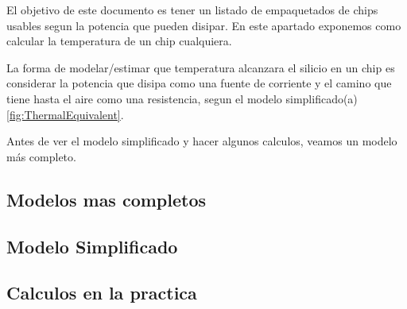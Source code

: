 El objetivo de este documento es tener un listado de empaquetados de chips usables segun
la potencia que pueden disipar. En este apartado exponemos como calcular la temperatura de un
chip cualquiera.

La forma de modelar/estimar que temperatura alcanzara el silicio en un chip es considerar
la potencia que disipa como una fuente de corriente y el camino que tiene hasta el aire como
una resistencia, segun el modelo simplificado(a)\ref{fig:ThermalEquivalent}.

Antes de ver el modelo simplificado y hacer algunos calculos, veamos un modelo más completo.

\subsection{Modelos mas completos}


\subsection{Modelo Simplificado}


\subsection{Calculos en la practica}




